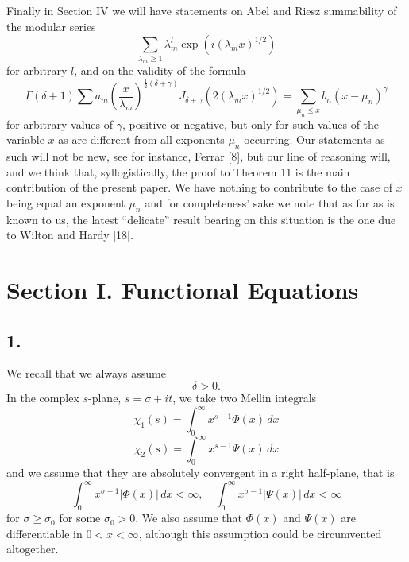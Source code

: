 \documentclass[12pt]{article}
\begin{document}
Finally in Section IV we will have statements on Abel and Riesz summability of the modular series
\begin{equation}
\sum_{\lambda_m \ge 1} \lambda_m^l \exp (i(\lambda_m x)^{1/2})
\tag{22}
\end{equation}
for arbitrary \(l\), and on the validity of the formula
\begin{equation}
\Gamma(\delta + 1) \sum a_m \left( \frac{x}{\lambda_m} \right)^{\frac{1}{2}(\delta+\gamma)} J_{\delta+\gamma}(2(\lambda_m x)^{1/2}) = \sum_{\mu_n \le x} b_n (x - \mu_n)^\gamma
\tag{23}
\end{equation}
for arbitrary values of \(\gamma\), positive or negative, but only for such values of the variable \(x\) as are different from all exponents \(\mu_n\) occurring. Our statements as such will not be new, see for instance, Ferrar [8], but our line of reasoning will, and we think that, syllogistically, the proof to Theorem 11 is the main contribution of the present paper. We have nothing to contribute to the case of \(x\) being equal an exponent \(\mu_n\) and for completeness' sake we note that as far as is known to us, the latest ``delicate'' result bearing on this situation is the one due to Wilton and Hardy [18].

\section*{Section I. Functional Equations}

\subsection*{1.}

We recall that we always assume
\[
\delta > 0.
\]
In the complex \(s\)-plane, \(s = \sigma + it\), we take two Mellin integrals
\begin{equation}
\chi_1(s) = \int_0^{\infty} x^{s-1} \Phi(x) \, dx
\tag{24}
\end{equation}
\begin{equation}
\chi_2(s) = \int_0^{\infty} x^{s-1} \Psi(x) \, dx
\tag{25}
\end{equation}
and we assume that they are absolutely convergent in a right half-plane, that is
\begin{equation}
\int_0^{\infty} x^{\sigma-1} |\Phi(x)| \, dx < \infty, \quad \int_0^{\infty} x^{\sigma-1} |\Psi(x)| \, dx < \infty
\tag{26}
\end{equation}
for \(\sigma \ge \sigma_0\) for some \(\sigma_0 > 0\). We also assume that \(\Phi(x)\) and \(\Psi(x)\) are differentiable in \(0 < x < \infty\), although this assumption could be circumvented altogether.
\end{document}
